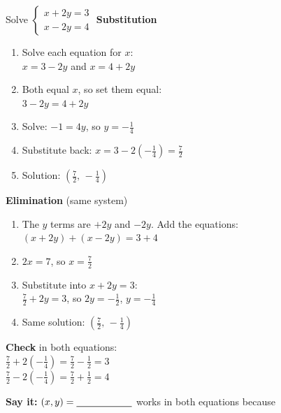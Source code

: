 \begin{minipage}[t]{0.5\textwidth}
\vspace{0pt}
Solve $\begin{cases} x+2y=3\\ x-2y=4\end{cases}$ \quad\textbf{Substitution}
\begin{enumerate}[label=\textbf{\arabic*.}, itemsep=1pt]
\item Solve each equation for $x$:\\ $x=3-2y$ \quad and \quad $x=4+2y$
\item Both equal $x$, so set them equal:\\ $3-2y=4+2y$
\item Solve: $-1=4y$, so $y=-\tfrac14$
\item Substitute back: $x=3-2\!\left(-\tfrac14\right)=\tfrac72$
\item Solution: $\left(\tfrac72,\,-\tfrac14\right)$
\end{enumerate}
\end{minipage}\hfill
\begin{minipage}[t]{0.47\textwidth}
\vspace{0pt}
\textbf{Elimination} (same system)
\begin{enumerate}[label=\textbf{\arabic*.}, itemsep=1pt]
\item The $y$ terms are $+2y$ and $-2y$. Add the equations:\\
$(x+2y)+(x-2y)=3+4$
\item $2x=7$, so $x=\tfrac72$
\item Substitute into $x+2y=3$:\\ $\tfrac72+2y=3$, so $2y=-\tfrac12$, $y=-\tfrac14$
\item Same solution: $\left(\tfrac72,\,-\tfrac14\right)$
\end{enumerate}
\textbf{Check} in both equations:\\
$\tfrac72+2\!\left(-\tfrac14\right)=\tfrac72-\tfrac12=3$ \checkmark\\
$\tfrac72-2\!\left(-\tfrac14\right)=\tfrac72+\tfrac12=4$ \checkmark
\end{minipage}

\vspace{-6pt}\textbf{Say it:} $(x,y)=\blank[2cm]$ works in both equations because \lines[2]\vspace{-12pt}

